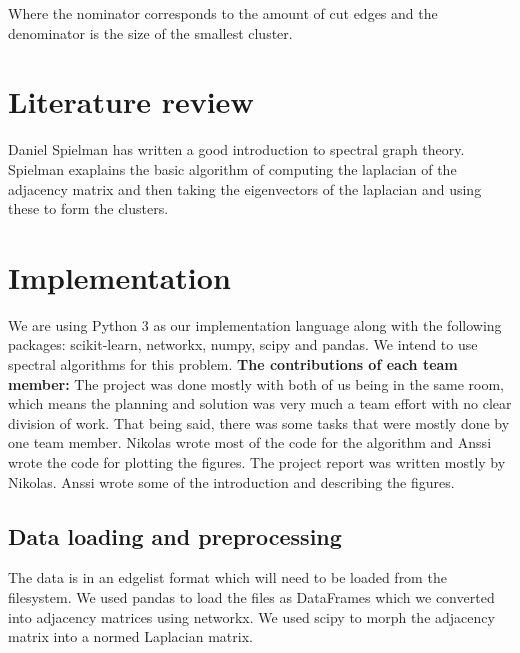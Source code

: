 \documentclass{article}
\begin{document}
Where the nominator corresponds to the amount of cut edges and the denominator is the size of the smallest cluster. 

\section{Literature review}
Daniel Spielman \cite{speilman} has written a good introduction to spectral graph theory.
Spielman exaplains the basic algorithm of computing the laplacian of the adjacency
matrix and then taking the eigenvectors of the laplacian and using these to form the clusters.


\section{Implementation} %

We are using Python 3 as our implementation language along with the following packages: scikit-learn, networkx, numpy, scipy and pandas. We intend to use spectral algorithms for this problem.
\newline\newline
\textbf{The contributions of each team member:}\newline
The project was done mostly with both of us being in the same room, which means the
planning and solution was very much a team effort with no clear division of work. That being said,
there was some tasks that were mostly done by one team member. Nikolas wrote most of the code
for the algorithm and Anssi wrote the code for plotting the figures. The project
report was written mostly by Nikolas. Anssi wrote some of the introduction and
describing the figures.

\subsection{Data loading and preprocessing}

The data is in an edgelist format which will need to be loaded from the filesystem. We used pandas to load the files as DataFrames which we converted into adjacency matrices using networkx. We used scipy to morph the adjacency matrix into a normed Laplacian matrix.
	
\end{document}
